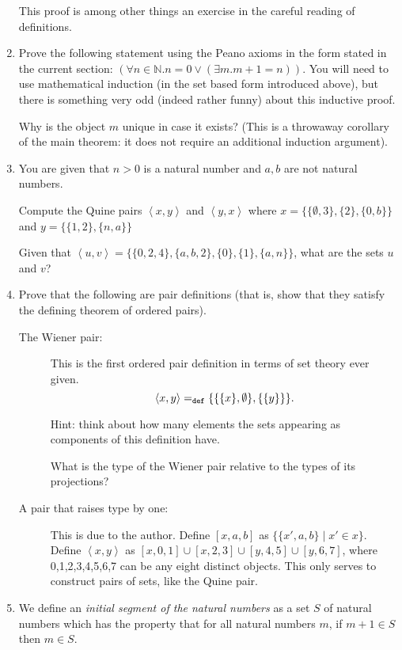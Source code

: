 \documentclass[12pt]{book}
\begin{document}
\begin{enumerate}
This proof is among other things an exercise in the careful reading of
definitions.



\item
Prove the following statement using the Peano axioms in the form
stated in the current section: $(\forall n \in {\mathbb N}.n = 0 \vee
(\exists m.m+1=n))$.  You will need to use mathematical induction (in
the set based form introduced above), but there is something very odd
(indeed rather funny) about this inductive proof.

Why is the object $m$ unique in case it exists? (This is a throwaway
corollary of the main theorem: it does not require an additional
induction argument).

\item  
You are given that $n>0$ is a natural number and $a,b$ are not natural
numbers.

Compute the Quine pairs $\left<x,y\right>$ and $\left<y,x\right>$ where $x =
\{\{\emptyset,3\},\{2\},\{0,b\}\}$ and $y = \{\{1,2\},\{n,a\}\}$ 

Given that $\left<u,v\right> =\{\{0,2,4\},\{a,b,2\},\{0\},\{1\},\{a,n\}\}$, what are the sets $u$
and $v$?

\item
Prove that the following are pair definitions (that is, show that they
satisfy the defining theorem of ordered pairs).

\begin{description}

\item[The Wiener pair:] This is the first ordered pair definition in
terms of set theory ever given.
$$\left<x,y\right> = _{\tt def} \{\{\{x\},\emptyset\},\{\{y\}\}\}.$$

Hint:  think about how many elements the sets appearing as components of this definition have.

What is the type of the Wiener pair relative to the types of its projections?

\item[A pair that raises type by one:]  This is due to the author.
Define $[x,a,b]$ as $\{\{x',a,b\}\mid x'\in x\}$.  Define $\left<x,y\right>$ as
$[x,0,1] \cup [x,2,3] \cup [y,4,5] \cup [y,6,7]$, where 0,1,2,3,4,5,6,7 can be any eight distinct objects.   This only serves to construct pairs of sets, like the Quine pair.

\end{description}

\item
We define an {\em initial segment of the natural numbers\/} as a set
$S$ of natural numbers which has the property that for all natural
numbers $m$, if $m+1 \in S$ then $m \in S$.


\end{enumerate}
\end{document}
